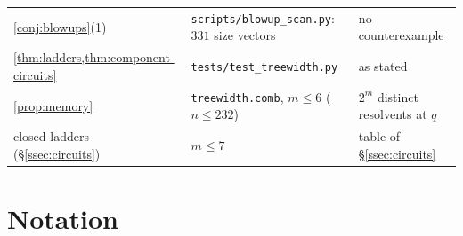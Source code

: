 \documentclass[11pt]{amsart}
\theoremstyle{plain}
\theoremstyle{definition}
\theoremstyle{remark}
\numberwithin{equation}{section}
\newcommand{\code}[1]{{\ttfamily\nolinkurl{#1}}}
\begin{document}
\begin{center}
\begin{longtable}{@{}L{0.25}L{0.43}L{0.25}@{}}
\cref{conj:blowups}(1) & \code{scripts/blowup_scan.py}: $331$ size vectors & no counterexample\\
\cref{thm:ladders,thm:component-circuits} & \code{tests/test_treewidth.py} & as stated\\
\cref{prop:memory} & \code{treewidth.comb}, $m\le6$ ($n\le232$) & $2^{m}$ distinct resolvents at $q$\\
closed ladders (\S\ref{ssec:circuits}) & $m\le7$ & table of \S\ref{ssec:circuits}\\
\bottomrule
\end{longtable}
\end{center}

\section{Notation}\label{app:notation}
\end{document}
